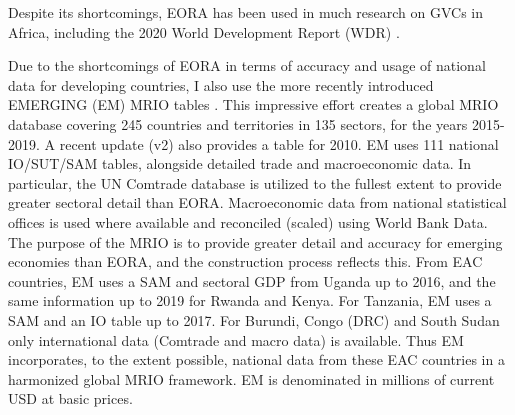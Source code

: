 \documentclass[a4paper]{article}
\begin{document}
Despite its shortcomings, EORA has been used in much research on GVCs in Africa, including the 2020 World Development Report (WDR) \citep{world2020trading}.\newline 

Due to the shortcomings of EORA in terms of accuracy and usage of national data for developing countries, I also use the more recently introduced EMERGING (EM) MRIO tables \citep{huo2022full}. This impressive effort creates a global MRIO database covering 245 countries and territories in 135 sectors, for the years 2015-2019. A recent update (v2) also provides a table for 2010. EM uses 111 national IO/SUT/SAM tables, alongside detailed trade and macroeconomic data. In particular, the UN Comtrade database is utilized to the fullest extent to provide greater sectoral detail than EORA. Macroeconomic data from national statistical offices is used where available and reconciled (scaled) using World Bank Data. The purpose of the MRIO is to provide greater detail and accuracy for emerging economies than EORA, and the construction process reflects this. From EAC countries, EM uses a SAM and sectoral GDP from Uganda up to 2016, and the same information up to 2019 for Rwanda and Kenya. For Tanzania, EM uses a SAM and an IO table up to 2017. For Burundi, Congo (DRC) and South Sudan only international data (Comtrade and macro data) is available. Thus EM incorporates, to the extent possible, national data from these EAC countries in a harmonized global MRIO framework. EM is denominated in millions of current USD at basic prices. \newline
\end{document}
